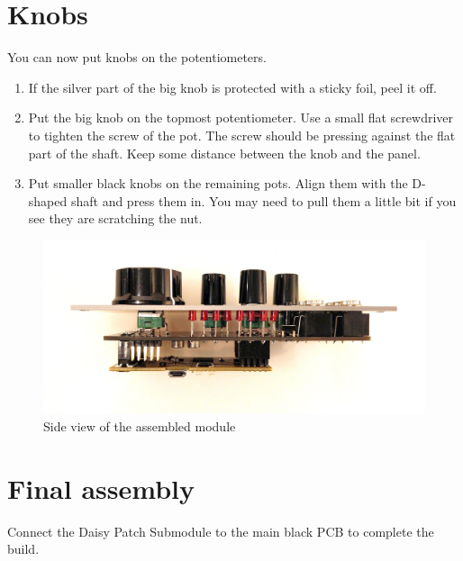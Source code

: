 \documentclass[10pt,a4paper,twocolumn]{article}
\begin{document}
\clearpage

\section{Knobs}

You can now put knobs on the potentiometers.

\begin{enumerate}
  \item If the silver part of the big knob is protected with a sticky foil, peel it off.
  \item Put the big knob on the topmost potentiometer. Use a small flat screwdriver to tighten the screw of the pot. The screw should be pressing against the flat part of the shaft. Keep some distance between the knob and the panel.
  \item Put smaller black knobs on the remaining pots. Align them with the D-shaped shaft and press them in. You may need to pull them a little bit if you see they are scratching the nut.
\end{enumerate}

\begin{figure}[p]
  \centering
  \includegraphics[width=\linewidth]{p07.jpg}
  \caption{Side view of the assembled module}
\end{figure}

\section{Final assembly}

Connect the Daisy Patch Submodule to the main black PCB to complete the build.
\end{document}
